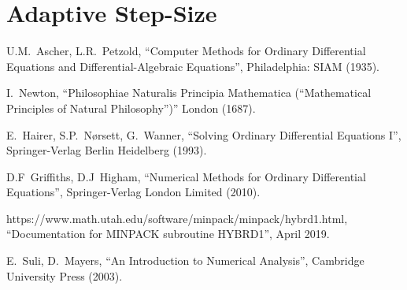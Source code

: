 \documentclass[12pt, twoside]{report}
\theoremstyle{plain}
\theoremstyle{definition}
\begin{document}
    \section{Adaptive Step-Size}
    \label{2_adaptive}





\begin{thebibliography}{50}
        U.M.~Ascher, L.R.~Petzold,
        ``Computer Methods for Ordinary Differential Equations and 
        Differential-Algebraic Equations'',
        Philadelphia: SIAM (1935).

        I.~Newton,
        ``Philosophiae Naturalis Principia Mathematica (“Mathematical
        Principles of Natural Philosophy”)'' London (1687).

        E.~Hairer, S.P.~N{\o}rsett, G.~Wanner,
        ``Solving Ordinary Differential Equations I'',
        Springer-Verlag Berlin Heidelberg (1993).

        D.F~Griffiths, D.J~Higham,
        ``Numerical Methods for Ordinary Differential Equations'',
        Springer-Verlag London Limited (2010).

        https://www.math.utah.edu/software/minpack/minpack/hybrd1.html,
        ``Documentation for MINPACK subroutine HYBRD1'',
        April 2019.

        E.~Suli, D.~Mayers,
        ``An Introduction to Numerical Analysis'',
        Cambridge University Press (2003).


\end{thebibliography}
\end{document}
